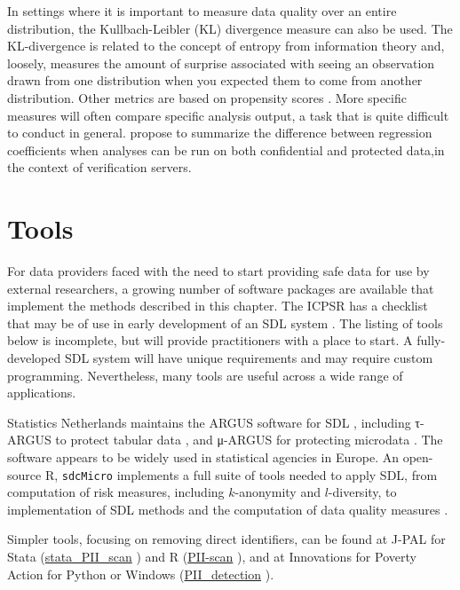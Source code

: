 \documentclass[
]{book}
\begin{document}
In settings where it is important to measure data quality over an entire distribution, the Kullbach-Leibler (KL) divergence measure can also be used. The KL-divergence is related to the concept of entropy from information theory and, loosely, measures the amount of surprise associated with seeing an observation drawn from one distribution when you expected them to come from another distribution. Other metrics are based on propensity scores \citep{woo_global_2009, snoke_general_2018}. More specific measures will often compare specific analysis output, a task that is quite difficult to conduct in general. \citet{reiter_verification_2009} propose to summarize the difference between regression coefficients when analyses can be run on both confidential and protected data,in the context of verification servers.

\hypertarget{tools}{%
\section{Tools}\label{tools}}

For data providers faced with the need to start providing safe data for use by external researchers, a growing number of software packages are available that implement the methods described in this chapter. The ICPSR has a checklist that may be of use in early development of an SDL system \citep{icpsr_disclosure_2020}. The listing of tools below is incomplete, but will provide practitioners with a place to start. A fully-developed SDL system will have unique requirements and may require custom programming. Nevertheless, many tools are useful across a wide range of applications.

Statistics Netherlands maintains the ARGUS software for SDL \citep{hundepool_argus_1998}, including τ-ARGUS to protect tabular data \citep{de_wolf_-argus_2018}, and μ-ARGUS for protecting microdata \citep{hundepool_-argus_2018}. The software appears to be widely used in statistical agencies in Europe. An open-source R, \texttt{sdcMicro} implements a full suite of tools needed to apply SDL, from computation of risk measures, including \(k\)-anonymity and \(l\)-diversity, to implementation of SDL methods and the computation of data quality measures \citetext{\citealp[ ]{templ_statistical_2015}; \citealp{templ_sdcmicro_2020}}.

Simpler tools, focusing on removing direct identifiers, can be found at J-PAL for Stata (\href{https://github.com/J-PAL/stata_PII_scan}{stata\_PII\_scan} \citet{j-pal_j-palstata_pii_scan_2020}) and R (\href{https://github.com/J-PAL/PII-Scan}{PII-scan} \citet{j-pal_j-palpii-scan_2020}), and at Innovations for Poverty Action for Python or Windows (\href{https://github.com/PovertyAction/PII_detection}{PII\_detection} \citet{innovations_for_poverty_action_povertyactionpii_detection_2020}).
\end{document}
